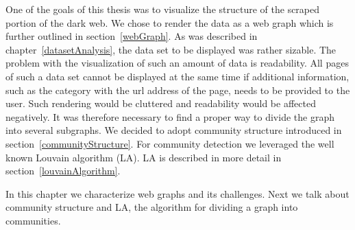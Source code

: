 One of the goals of this thesis was to visualize the structure of the scraped portion of the dark web. We chose to render the data as a web graph which is further outlined in section~\ref{webGraph}. As was described in chapter~\ref{datasetAnalysis}, the data set to be displayed was rather sizable. The problem with the visualization of such an amount of data is readability. All pages of such a data set cannot be displayed at the same time if additional information, such as the category with the url address of the page, needs to be provided to the user. Such rendering would be cluttered and readability would be affected negatively. It was therefore necessary to find a proper way to divide the graph into several subgraphs. We decided to adopt community structure introduced in section~\ref{communityStructure}. For community detection we leveraged the well known Louvain algorithm (LA). LA is described in more detail in section~\ref{louvainAlgorithm}.

In this chapter we characterize web graphs and its challenges. Next we talk about community structure and LA, the algorithm for dividing a graph into communities. 
 
